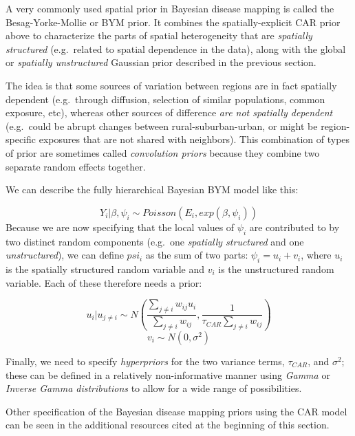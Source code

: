 \documentclass[
]{book}
\begin{document}
A very commonly used spatial prior in Bayesian disease mapping is called the Besag-Yorke-Mollie or BYM prior. It combines the spatially-explicit CAR prior above to characterize the parts of spatial heterogeneity that are \emph{spatially structured} (e.g.~related to spatial dependence in the data), along with the global or \emph{spatially unstructured} Gaussian prior described in the previous section.

The idea is that some sources of variation between regions are in fact spatially dependent (e.g.~through diffusion, selection of similar populations, common exposure, etc), whereas other sources of difference \emph{are not spatially dependent} (e.g.~could be abrupt changes between rural-suburban-urban, or might be region-specific exposures that are not shared with neighbors). This combination of types of prior are sometimes called \emph{convolution priors} because they combine two separate random effects together.

We can describe the fully hierarchical Bayesian BYM model like this:

\[Y_i|\beta, \psi_i \sim Poisson(E_i, exp(\beta, \psi_i))\]
Because we are now specifying that the local values of \(\psi_i\) are contributed to by two distinct random components (e.g.~one \emph{spatially structured} and one \emph{unstructured}), we can define \(psi_i\) as the sum of two parts: \(\psi_i = u_i + v_i\), where \(u_i\) is the spatially structured random variable and \(v_i\) is the unstructured random variable. Each of these therefore needs a prior:

\[u_i|u_{j \neq i} \sim N\left(\frac{\sum_{j \neq i} w_{ij}u_i}{\sum_{j \neq i}w_{ij}}, \frac{1}{\tau_{CAR}\sum_{j \neq i}w_{ij}}\right)\]
\[v_i \sim N(0,\sigma^2)\]

Finally, we need to specify \emph{hyperpriors} for the two variance terms, \(\tau_{CAR}\), and \(\sigma^2\); these can be defined in a relatively non-informative manner using \emph{Gamma} or \emph{Inverse Gamma distributions} to allow for a wide range of possibilities.

Other specification of the Bayesian disease mapping priors using the CAR model can be seen in the additional resources cited at the beginning of this section.
\end{document}
